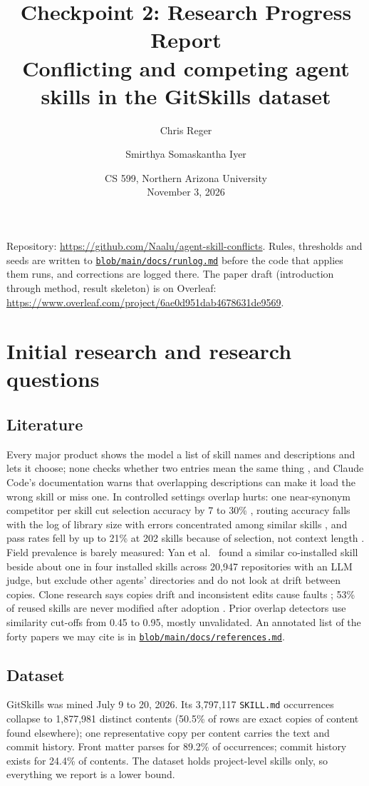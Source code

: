\documentclass[10pt]{article}
\title{\large\bfseries Checkpoint 2: Research Progress Report\\[3pt]
\normalsize\mdseries Conflicting and competing agent skills in the GitSkills dataset}
\author{\normalsize Chris Reger \and \normalsize Smirthya Somaskantha Iyer}
\date{\normalsize CS 599, Northern Arizona University \\ November 3, 2026}
\newcommand{\repo}[1]{\href{https://github.com/Naalu/agent-skill-conflicts/#1}{\texttt{#1}}}
\begin{document}
\maketitle
\vspace{-14pt}
\noindent Repository: \url{https://github.com/Naalu/agent-skill-conflicts}. Rules, thresholds and seeds are written to
\repo{blob/main/docs/runlog.md} before the code that applies them runs, and corrections are logged there. The paper draft
(introduction through method, result skeleton) is on Overleaf:
\url{https://www.overleaf.com/project/6ae0d951dab4678631de9569}.

\section{Initial research and research questions}

\subsection{Literature}
Every major product shows the model a list of skill names and descriptions and lets it choose; none checks whether
two entries mean the same thing \cite{agentskillsspec2026,claudecodeskills2026,codexskills2026}, and Claude Code's
documentation warns that overlapping descriptions can make it load the wrong skill or miss one. In controlled settings
overlap hurts: one near-synonym competitor per skill cut selection accuracy by 7 to 30\% \cite{li2026singleagent},
routing accuracy falls with the log of library size with errors concentrated among similar skills
\cite{chen2026scaling}, and pass rates fell by up to 21\% at 202 skills because of selection, not context length
\cite{song2026shadowing}. Field prevalence is barely measured: Yan et al.\ \cite{oneskilltoomany2026} found a similar
co-installed skill beside about one in four installed skills across 20,947 repositories with an LLM judge, but exclude
other agents' directories and do not look at drift between copies. Clone research says copies drift and inconsistent
edits cause faults \cite{kim2005genealogies,juergens2009clones}; 53\% of reused skills are never modified after adoption
\cite{gao2026reuse}. Prior overlap detectors use similarity cut-offs from 0.45 to 0.95, mostly unvalidated. An annotated
list of the forty papers we may cite is in \repo{blob/main/docs/references.md}.

\subsection{Dataset}
GitSkills \cite{destefanis2026gitskills} was mined July 9 to 20, 2026. Its 3,797,117 \texttt{SKILL.md} occurrences
collapse to 1,877,981 distinct contents (50.5\% of rows are exact copies of content found elsewhere); one representative
copy per content carries the text and commit history. Front matter parses for 89.2\% of occurrences; commit history
exists for 24.4\% of contents. The dataset holds project-level skills only, so everything we report is a lower bound.
\end{document}
